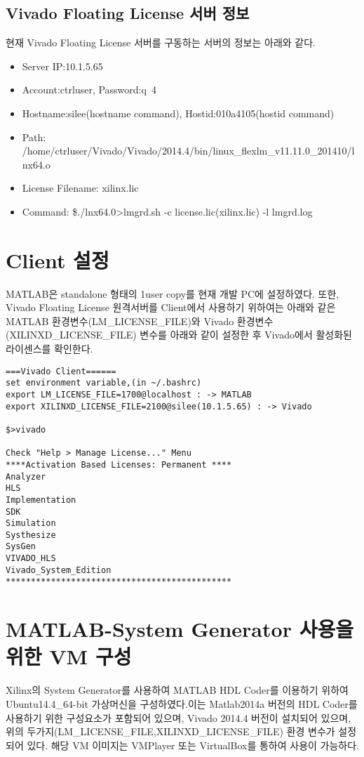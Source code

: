 \documentclass[11pt
  , a4paper
  , article
  , oneside
]{memoir}
\begin{document}
\section{Vivado Floating License 서버 정보}
현재 Vivado Floating License 서버를 구동하는 서버의 정보는 아래와 같다.

\begin{itemize}
	\item Server IP:10.1.5.65 
	\item Account:ctrluser, Password:q~4
	\item Hostname:silee(hostname command), Hostid:010a4105(hostid command)
	\item Path: /home/ctrluser/Vivado/Vivado/2014.4/bin/linux\_flexlm\_v11.11.0\_201410/lnx64.o
	\item License Filename: xilinx.lic
	\item Command: \$./lnx64.0>lmgrd.sh -c license.lic(xilinx.lic) -l lmgrd.log
\end{itemize}

\chapter{Client 설정}
MATLAB은 standalone 형태의 1user copy를 현재 개발 PC에 설정하였다. 또한, Vivado Floating License 원격서버를 Client에서 사용하기 위하여는 아래와 같은 MATLAB 환경변수(LM\_LICENSE\_FILE)와 Vivado 환경변수(XILINXD\_LICENSE\_FILE) 변수를 아래와 같이 설정한 후 Vivado에서 활성화된 라이센스를 확인한다.

\begin{lstlisting}[style=termstyle, escapechar=!]
===Vivado Client======
set environment variable,(in ~/.bashrc)
export LM_LICENSE_FILE=1700@localhost : -> MATLAB
export XILINXD_LICENSE_FILE=2100@silee(10.1.5.65) : -> Vivado

$>vivado

Check "Help > Manage License..." Menu
****Activation Based Licenses: Permanent ****
Analyzer
HLS
Implementation
SDK
Simulation
Systhesize
SysGen
VIVADO_HLS
Vivado_System_Edition
*********************************************
\end{lstlisting}


\chapter{MATLAB-System Generator 사용을 위한 VM 구성}
Xilinx의 System Generator를 사용하여 MATLAB HDL Coder를 이용하기 위하여 Ubuntu14.4\_64-bit 가상머신을 구성하였다.이는 Matlab2014a 버전의 HDL Coder를 사용하기 위한 구성요소가 포함되어 있으며, Vivado 2014.4 버전이 설치되어 있으며,위의 두가지(LM\_LICENSE\_FILE,XILINXD\_LICENSE\_FILE) 환경 변수가 설정되어 있다. 해당 VM 이미지는 VMPlayer 또는 VirtualBox를 통하여 사용이 가능하다.
\end{document}
